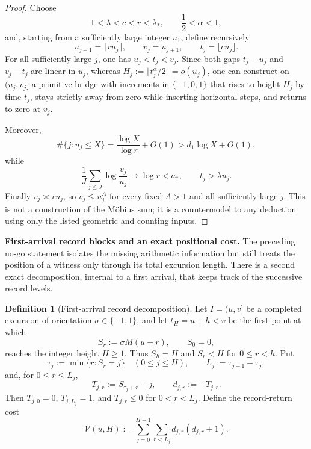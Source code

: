 \documentclass[11pt,reqno]{amsart}
\numberwithin{equation}{section}
\theoremstyle{plain}
\theoremstyle{definition}
\newtheorem{definition}[theorem]{Definition}
\theoremstyle{remark}
\begin{document}
\begin{proof}
Choose
\begin{equation}
1<\lambda<c<r<\lambda_*,\qquad \frac12<\alpha<1,
\end{equation}
and, starting from a sufficiently large integer $u_1$, define recursively
\begin{equation}
u_{j+1}=\lceil r u_j\rceil,\qquad
v_j=u_{j+1},\qquad
t_j=\lfloor c u_j\rfloor.
\end{equation}
For all sufficiently large $j$, one has $u_j<t_j<v_j$.  Since both gaps
$t_j-u_j$ and $v_j-t_j$ are linear in $u_j$, whereas
$H_j:=\lfloor t_j^\alpha/2\rfloor=o(u_j)$, one can construct on
$(u_j,v_j]$ a primitive bridge with increments in $\{-1,0,1\}$ that rises to
height $H_j$ by time $t_j$, stays strictly away from zero while inserting
horizontal steps, and returns to zero at $v_j$.

Moreover,
\begin{equation}
\#\{j:u_j\le X\}=\frac{\log X}{\log r}+O(1)>d_1\log X+O(1),
\end{equation}
while
\begin{equation}
\frac1J\sum_{j\le J}\log\frac{v_j}{u_j}\longrightarrow\log r<a_*,
\qquad
t_j>\lambda u_j.
\end{equation}
Finally $v_j\asymp r u_j$, so $v_j\le u_j^A$ for every fixed $A>1$ and all
sufficiently large $j$.  This is not a construction of the Möbius sum;
it is a countermodel to any deduction using only the listed geometric and
counting inputs.
\end{proof}


\medskip
\noindent\textbf{First-arrival record blocks and an exact positional cost.}
The preceding no-go statement isolates the missing arithmetic information but
still treats the position of a witness only through its total excursion length.
There is a second exact decomposition, internal to a first arrival, that keeps
track of the successive record levels.

\begin{definition}[First-arrival record decomposition]
\label{def:first-arrival-records}
Let $I=(u,v]$ be a completed excursion of orientation $\sigma\in\{-1,1\}$,
and let $t_H=u+h<v$ be the first point at which
\begin{equation}
S_r:=\sigma M(u+r),\qquad S_0=0,
\end{equation}
reaches the integer height $H\ge1$.  Thus $S_h=H$ and $S_r<H$ for
$0\le r<h$.  Put
\begin{equation}
\tau_j:=\min\{r:S_r=j\}\quad(0\le j\le H),\qquad
L_j:=\tau_{j+1}-\tau_j,
\end{equation}
and, for $0\le r\le L_j$,
\begin{equation}
T_{j,r}:=S_{\tau_j+r}-j,\qquad d_{j,r}:=-T_{j,r}.
\end{equation}
Then $T_{j,0}=0$, $T_{j,L_j}=1$, and $T_{j,r}\le0$ for
$0<r<L_j$.  Define the record-return cost
\begin{equation}
\label{eq:record-cost}
\mathcal V(u,H):=\sum_{j=0}^{H-1}\sum_{r<L_j}d_{j,r}(d_{j,r}+1).
\end{equation}
\end{definition}
\end{document}
